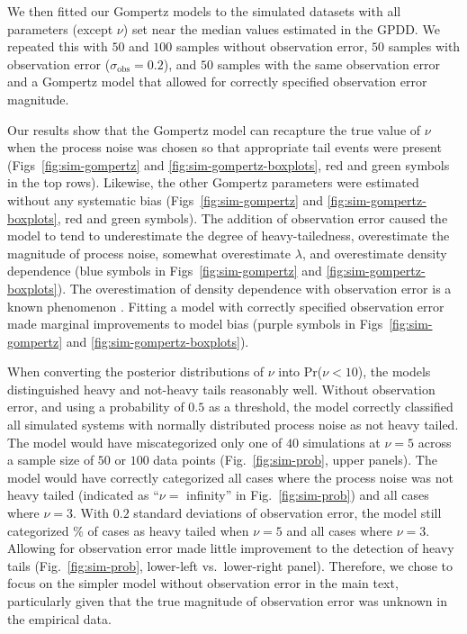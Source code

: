We then fitted our Gompertz models to the simulated datasets with all
parameters (except $\nu$) set near the median values estimated in the GPDD. We
repeated this with $50$ and $100$ samples without observation error, $50$
samples with observation error ($\sigma_\mathrm{obs} = 0.2$), and $50$ samples
with the same observation error and a Gompertz model that allowed for correctly
specified observation error magnitude.

Our results show that the Gompertz model can recapture the true value of $\nu$
when the process noise was chosen so that appropriate tail events were present
(Figs~\ref{fig:sim-gompertz} and \ref{fig:sim-gompertz-boxplots}, red and green
symbols in the top rows). Likewise, the other Gompertz parameters were
estimated without any systematic bias (Figs~\ref{fig:sim-gompertz} and
\ref{fig:sim-gompertz-boxplots}, red and green symbols). The addition of
observation error caused the model to tend to underestimate the degree of
heavy-tailedness, overestimate the magnitude of process noise, somewhat
overestimate $\lambda$, and overestimate density dependence (blue symbols in
Figs~\ref{fig:sim-gompertz} and \ref{fig:sim-gompertz-boxplots}). The
overestimation of density dependence with observation error is a known
phenomenon \citep{knape2012}. Fitting a model with correctly specified
observation error made marginal improvements to model bias (purple symbols in
Figs~\ref{fig:sim-gompertz} and \ref{fig:sim-gompertz-boxplots}).

When converting the posterior distributions of $\nu$ into Pr($\nu < 10$), the
models distinguished heavy and not-heavy tails reasonably well. Without
observation error, and using a probability of $0.5$ as a threshold, the model
correctly classified all simulated systems with normally distributed process
noise as not heavy tailed. The model would have miscategorized only one of $40$
simulations at $\nu = 5$ across a sample size of $50$ or $100$ data points
(Fig.~\ref{fig:sim-prob}, upper panels). The model would have correctly
categorized all cases where the process noise was not heavy tailed (indicated
as ``$\nu =$ infinity'' in Fig.~\ref{fig:sim-prob}) and all cases where $\nu
= 3$. With $0.2$ standard deviations of observation error, the model still
categorized \obsErrorNuFivePerc\% of cases as heavy tailed when $\nu = 5$ and
all cases where $\nu = 3$. Allowing for observation error made little
improvement to the detection of heavy tails (Fig.~\ref{fig:sim-prob},
lower-left vs.\ lower-right panel). Therefore, we chose to focus on the simpler
model without observation error in the main text, particularly given that the
true magnitude of observation error was unknown in the empirical data.

